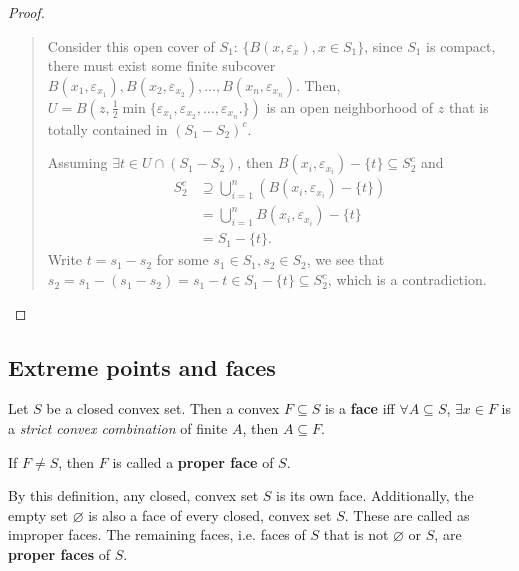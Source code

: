 \begin{proof}
\begin{quote}
    Consider this open cover of \( S_{1} \): \( \{B \left( x,
    \varepsilon_{x} \right) , x \in
    S_{1}\}   \), since \( S_{1} \) is compact, there must exist some finite
    subcover \( B \left( x_{1}, \varepsilon_{x_{1}} \right), B(x_{2},
    \varepsilon_{x_{2}}), \ldots ,
    B \left( x_{n}, \varepsilon_{x_{n}} \right) \). Then, \( U = B
    \left( z, \frac{1}{2}\min \{\varepsilon_{x_{1}}, \varepsilon_{x_{2}},
      \ldots, \varepsilon_{x_{n}} .\}
    \right)  \) is an open neighborhood of \( z \) that is totally contained in
    \( (S_{1}-S_{2})^{c} \).

    Assuming \( \exists t \in U \cap (S_{1}-S_{2}) \), then \( B \left( x_{i},
    \varepsilon_{x_{i}} \right) - \{t\} \subseteq S_{2}^{c}  \) and
    \begin{align*}
      S_{2}^{c} &\supseteq \bigcup_{i = 1}^{n} \left( B \left( x_{i},
      \varepsilon_{x_{i}} \right) - \{t\}   \right) \\
                &= \bigcup_{i = 1}^{n} B \left( x_{i}, \varepsilon_{x_{i}}
                \right) - \{t\} \\
                &= S_{1} - \{t\}   
    .\end{align*}
    Write \( t = s_{1} - s_{2} \) for some \( s_{1} \in S_{1}, s_{2} \in S_{2}
    \), we see that \( s_{2} = s_{1} - (s_{1} - s_{2}) = s_{1} - t \in S_{1} -
    \{t\}   \subseteq    S_{2}^{c} \), which is a contradiction.
  \end{quote}
\end{proof}


\subsection{Extreme points and faces} %
\label{sub:Extreme points and faces}

\begin{definition}
  Let \( S \) be a closed convex set. Then a convex \( F \subseteq S \)
  is a \textbf{face} iff \( \forall A \subseteq S \),
  \( \exists x \in F \) is a \textit{strict convex combination} of
  finite \( A \), then \( A \subseteq F \).

  If \( F \neq S \), then \( F \) is called a \textbf{proper face} of \( S \).
\end{definition}

By this definition, any closed, convex set \( S \) is its own face.
Additionally, the empty set \( \varnothing \) is also a face of every closed,
convex set \( S \). These are called as improper faces. The remaining faces,
i.e. faces of \( S \) that is not \( \varnothing \) or \( S \), are
\textbf{proper faces} of \( S \).

